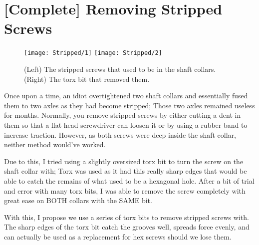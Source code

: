 \section{[Complete] Removing Stripped Screws}

\begin{figure}[h]
    \centering
    \texttt{[image: Stripped/1]}
    \texttt{[image: Stripped/2]}
    \caption{
        (Left) The stripped screws that used to be in the shaft collars. (Right) The torx bit that removed them.
    }
\end{figure}

Once upon a time, an idiot overtightened two shaft collars and essentially fused them to two axles as they had become stripped; Those two axles remained useless for months. Normally, you remove stripped screws by either cutting a dent in them so that a flat head screwdriver can loosen it or by using a rubber band to increase traction. However, as both screws were deep inside the shaft collar, neither method would've worked.

Due to this, I tried using a slightly oversized torx bit to turn the screw on the shaft collar with; Torx was used as it had this really sharp edges that would be able to catch the remains of what used to be a hexagonal hole. After a bit of trial and error with many torx bits, I was able to remove the screw completely with great ease on BOTH collars with the SAME bit.

With this, I propose we use a series of torx bits to remove stripped screws with. The sharp edges of the torx bit catch the grooves well, spreads force evenly, and can actually be used as a replacement for hex screws should we lose them.
